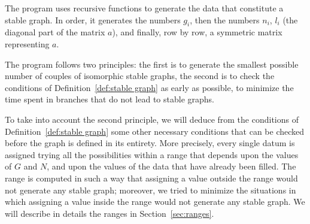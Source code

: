 \documentclass{amsart}
\theoremstyle{plain}
\theoremstyle{definition}
\begin{document}
The program uses recursive functions to generate the data that
constitute a stable graph. In order, it generates the numbers $g_i$,
then the numbers $n_i$, $l_i$ (the diagonal part of the matrix $a$),
and finally, row by row, a symmetric matrix representing $a$.

The program follows two principles: the first is to generate the
smallest possible number of couples of isomorphic stable graphs, the
second is to check the conditions of Definition~\ref{def:stable graph}
as early as possible, to minimize the time spent in branches that do
not lead to stable graphs.

To take into account the second principle, we will deduce from the
conditions of Definition~\ref{def:stable graph} some other necessary
conditions that can be checked before the graph is defined in its
entirety. More precisely, every single datum is assigned trying all
the possibilities within a range that depends upon the values of $G$
and $N$, and upon the values of the data that have already been
filled. The range is computed in such a way that assigning a value
outside the range would not generate any stable graph; moreover, we
tried to minimize the situations in which assigning a value inside the
range would not generate any stable graph. We will describe in details the ranges in Section~\ref{sec:ranges}.
\end{document}

